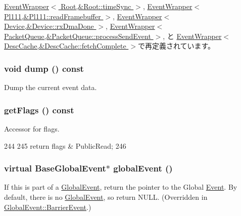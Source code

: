 \hyperlink{classEventWrapper_a2bd90422eece9190794479e08092a252}{EventWrapper$<$ Root,\&Root::timeSync $>$}, \hyperlink{classEventWrapper_a2bd90422eece9190794479e08092a252}{EventWrapper$<$ Pl111,\&Pl111::readFramebuffer $>$}, \hyperlink{classEventWrapper_a2bd90422eece9190794479e08092a252}{EventWrapper$<$ Device,\&Device::rxDmaDone $>$}, \hyperlink{classEventWrapper_a2bd90422eece9190794479e08092a252}{EventWrapper$<$ PacketQueue,\&PacketQueue::processSendEvent $>$}, と \hyperlink{classEventWrapper_a2bd90422eece9190794479e08092a252}{EventWrapper$<$ DescCache,\&DescCache::fetchComplete $>$}で再定義されています。\hypertarget{classEvent_a4a4fecb6d7cd9d0b8eb6579eee183af8}{
\subsubsection[{dump}]{\setlength{\rightskip}{0pt plus 5cm}void dump () const}}
\label{classEvent_a4a4fecb6d7cd9d0b8eb6579eee183af8}


Dump the current event data. \hypertarget{classEvent_acb0e52e5c94b8d10cbd9418ec342e01f}{
\subsubsection[{getFlags}]{ getFlags () const}}
\label{classEvent_acb0e52e5c94b8d10cbd9418ec342e01f}


Accessor for flags. 


\begin{DoxyCode}
244     {
245         return flags & PublicRead;
246     }
\end{DoxyCode}
\hypertarget{classEvent_a22afab66586c2982ac7548fba9e6835b}{
\subsubsection[{globalEvent}]{\setlength{\rightskip}{0pt plus 5cm}virtual {\bf BaseGlobalEvent}$\ast$ globalEvent ()}}
\label{classEvent_a22afab66586c2982ac7548fba9e6835b}
If this is part of a \hyperlink{classGlobalEvent}{GlobalEvent}, return the pointer to the Global \hyperlink{classEvent}{Event}. By default, there is no \hyperlink{classGlobalEvent}{GlobalEvent}, so return NULL. (Overridden in \hyperlink{classGlobalEvent_1_1BarrierEvent}{GlobalEvent::BarrierEvent}.) 

